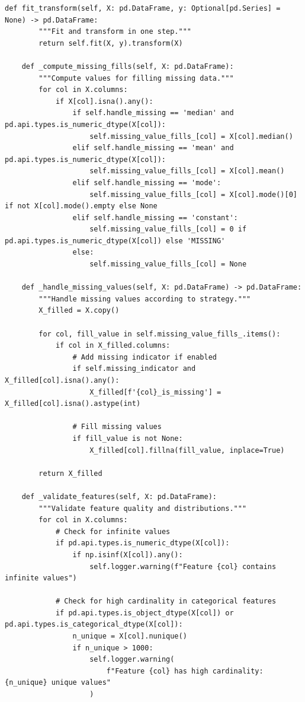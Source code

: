 \begin{lstlisting}[style=python, caption={Production Feature Engineering Framework}]
    def fit_transform(self, X: pd.DataFrame, y: Optional[pd.Series] = None) -> pd.DataFrame:
        """Fit and transform in one step."""
        return self.fit(X, y).transform(X)

    def _compute_missing_fills(self, X: pd.DataFrame):
        """Compute values for filling missing data."""
        for col in X.columns:
            if X[col].isna().any():
                if self.handle_missing == 'median' and pd.api.types.is_numeric_dtype(X[col]):
                    self.missing_value_fills_[col] = X[col].median()
                elif self.handle_missing == 'mean' and pd.api.types.is_numeric_dtype(X[col]):
                    self.missing_value_fills_[col] = X[col].mean()
                elif self.handle_missing == 'mode':
                    self.missing_value_fills_[col] = X[col].mode()[0] if not X[col].mode().empty else None
                elif self.handle_missing == 'constant':
                    self.missing_value_fills_[col] = 0 if pd.api.types.is_numeric_dtype(X[col]) else 'MISSING'
                else:
                    self.missing_value_fills_[col] = None

    def _handle_missing_values(self, X: pd.DataFrame) -> pd.DataFrame:
        """Handle missing values according to strategy."""
        X_filled = X.copy()

        for col, fill_value in self.missing_value_fills_.items():
            if col in X_filled.columns:
                # Add missing indicator if enabled
                if self.missing_indicator and X_filled[col].isna().any():
                    X_filled[f'{col}_is_missing'] = X_filled[col].isna().astype(int)

                # Fill missing values
                if fill_value is not None:
                    X_filled[col].fillna(fill_value, inplace=True)

        return X_filled

    def _validate_features(self, X: pd.DataFrame):
        """Validate feature quality and distributions."""
        for col in X.columns:
            # Check for infinite values
            if pd.api.types.is_numeric_dtype(X[col]):
                if np.isinf(X[col]).any():
                    self.logger.warning(f"Feature {col} contains infinite values")

            # Check for high cardinality in categorical features
            if pd.api.types.is_object_dtype(X[col]) or pd.api.types.is_categorical_dtype(X[col]):
                n_unique = X[col].nunique()
                if n_unique > 1000:
                    self.logger.warning(
                        f"Feature {col} has high cardinality: {n_unique} unique values"
                    )


\end{lstlisting}
